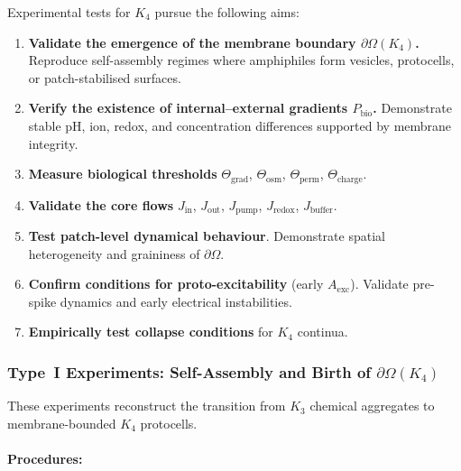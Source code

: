 Experimental tests for $K_4$ pursue the following aims:

\begin{enumerate}
    \item \textbf{Validate the emergence of the membrane boundary 
          $\partial\Omega(K_4)$.}  
          Reproduce self-assembly regimes where amphiphiles form vesicles, 
          protocells, or patch-stabilised surfaces.

    \item \textbf{Verify the existence of internal--external gradients 
          $P_{\mathrm{bio}}$.}  
          Demonstrate stable pH, ion, redox, and concentration 
          differences supported by membrane integrity.

    \item \textbf{Measure biological thresholds} $\Theta_{\mathrm{grad}}$, 
          $\Theta_{\mathrm{osm}}$, $\Theta_{\mathrm{perm}}$, 
          $\Theta_{\mathrm{charge}}$.

    \item \textbf{Validate the core flows} 
          $J_{\mathrm{in}}$, $J_{\mathrm{out}}$, $J_{\mathrm{pump}}$, 
          $J_{\mathrm{redox}}$, $J_{\mathrm{buffer}}$.

    \item \textbf{Test patch-level dynamical behaviour}.  
          Demonstrate spatial heterogeneity and graininess of $\partial\Omega$.

    \item \textbf{Confirm conditions for proto-excitability} (early $A_{\mathrm{exc}}$).  
          Validate pre-spike dynamics and early electrical instabilities.

    \item \textbf{Empirically test collapse conditions} for $K_4$ continua.
\end{enumerate}



\subsubsection{Type~I Experiments: Self-Assembly and Birth of \texorpdfstring{$\partial\Omega(K_4)$}{\partial\Omega(K_4)}}

These experiments reconstruct the transition from $K_3$ chemical 
aggregates to membrane-bounded $K_4$ protocells.

\paragraph{Procedures:}


